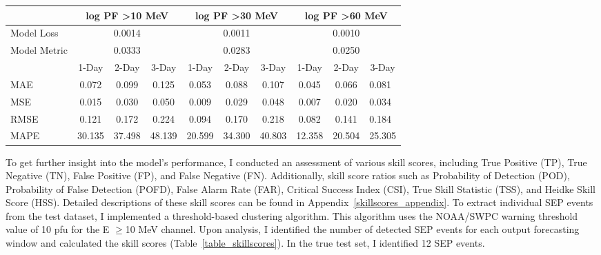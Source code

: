 \begin{table}[htp]
\begin{tabular}{lccccccccl}
       & \multicolumn{3}{c}{log PF \textgreater{}10 MeV} & \multicolumn{3}{c}{log PF \textgreater{}30 MeV} & \multicolumn{3}{c}{log PF \textgreater{}60 MeV} \\ \hline
Model Loss   & \multicolumn{3}{c}{0.0014}                      & \multicolumn{3}{c}{0.0011}                      & \multicolumn{3}{c}{0.0010}                      \\
Model Metric & \multicolumn{3}{c}{0.0333}                      & \multicolumn{3}{c}{0.0283}                      & \multicolumn{3}{c}{0.0250}                      \\ \hline
       & 1-Day          & 2-Day          & 3-Day         & 1-Day          & 2-Day          & 3-Day         & 1-Day    & 2-Day   & \multicolumn{1}{c}{3-Day}  \\ \hline
MAE    & 0.072          & 0.099          & 0.125         & 0.053          & 0.088          & 0.107         & 0.045    & 0.066   & 0.081                      \\
MSE    & 0.015          & 0.030          & 0.050         & 0.009          & 0.029          & 0.048         & 0.007    & 0.020   & 0.034                      \\
RMSE   & 0.121          & 0.172          & 0.224         & 0.094          & 0.170          & 0.218         & 0.082    & 0.141   & 0.184                      \\
MAPE   & 30.135         & 37.498         & 48.139        & 20.599         & 34.300         & 40.803        & 12.358   & 20.504  & 25.305                     \\ \hline
\end{tabular}
\label{table_performance}
\end{table}

To get further insight into the model's performance, I conducted an assessment of various skill scores, including True Positive (TP), True Negative (TN), False Positive (FP), and False Negative (FN). Additionally, skill score ratios such as Probability of Detection (POD), Probability of False Detection (POFD), False Alarm Rate (FAR), Critical Success Index (CSI), True Skill Statistic (TSS), and Heidke Skill Score (HSS). Detailed descriptions of these skill scores can be found in Appendix~\ref{skillscores_appendix}.
To extract individual SEP events from the test dataset, I implemented a threshold-based clustering algorithm. This algorithm uses the NOAA/SWPC warning threshold value of 10 pfu for the E $\geq$10 MeV channel. Upon analysis, I identified the number of detected SEP events for each output forecasting window and calculated the skill scores (Table~\ref{table_skillscores}). In the true test set, I identified 12 SEP events.

